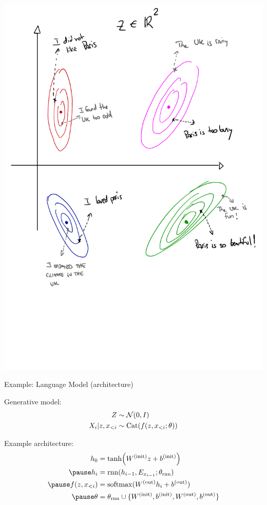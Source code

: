 \begin{frame}[plain]%

	\includegraphics[scale=0.4]{VAE-example}

\end{frame}

\begin{frame}{Example: Language Model (architecture)}

Generative model:
\begin{equation*}
\begin{aligned}
Z & \sim \mathcal N(0, I) \\
X_i|z, x_{<i} & \sim \operatorname{Cat}(f(z, x_{<i}; \theta))
\end{aligned}
\end{equation*}

\pause 
Example architecture:
\begin{equation*}
\begin{aligned}
h_0 &= \tanh(W^{(\text{init})} z + b^{(\text{init})}) \\ \pause
h_i &= \rnn(h_{i-1}, E_{x_{i-1}}; \theta_{\text{rnn}}) \\ \pause
f(z, x_{<i}) &= \softmax(W^{(\text{out})} h_i + b^{(\text{out})}) \\ \pause
\theta &= \theta_{\text{rnn}} \cup \{W^{(\text{init})}, b^{(\text{init})}, W^{(\text{out})}, b^{(\text{out})}\}
\end{aligned}
\end{equation*}


\end{frame}

